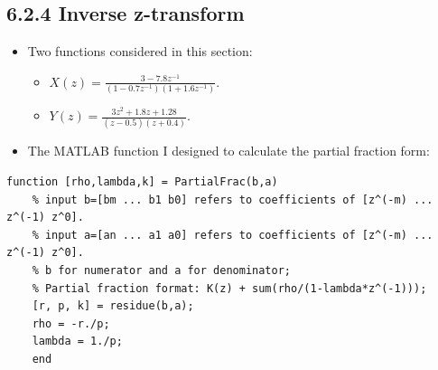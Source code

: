 \documentclass[onecolumn,oneside]{SUSTechHomework}
\begin{document}
\subsection*{6.2.4 Inverse z-transform}
\begin{itemize}
    \item Two functions considered in this section:
    \begin{itemize}
        \item $X(z)=\frac{3-7.8 z^{-1}}{\left(1-0.7 z^{-1}\right)\left(1+1.6 z^{-1}\right)}$.
        \item $Y(z)=\frac{3 z^{2}+1.8 z+1.28}{(z-0.5)(z+0.4)}$.
    \end{itemize}
    \item The MATLAB function I designed to calculate the partial fraction form:
\end{itemize}
\begin{lstlisting}[title = \textbf{PartialFrac.m}]
    function [rho,lambda,k] = PartialFrac(b,a)
    % input b=[bm ... b1 b0] refers to coefficients of [z^(-m) ... z^(-1) z^0].
    % input a=[an ... a1 a0] refers to coefficients of [z^(-m) ... z^(-1) z^0].
    % b for numerator and a for denominator;
    % Partial fraction format: K(z) + sum(rho/(1-lambda*z^(-1)));
    [r, p, k] = residue(b,a);
    rho = -r./p;
    lambda = 1./p;
    end
\end{lstlisting}
\end{document}

